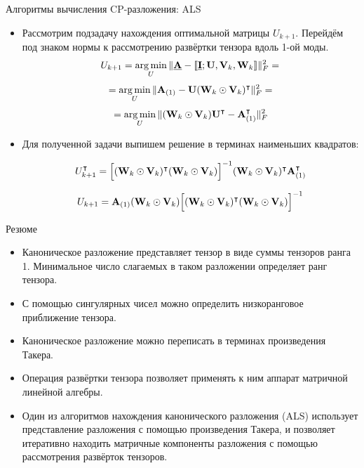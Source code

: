 \begin{frame}{Алгоритмы вычисления CP-разложения: ALS}

\begin{itemize}
    \item Рассмотрим подзадачу нахождения оптимальной матрицы $U_{k+1}$. Перейдём под знаком нормы к рассмотрению развёртки тензора вдоль 1-ой моды.
    $$ \displaystyle U_{k+1} = \operatorname*{arg\,min}_{U}{\lVert \underline{\textbf{A}} - \llbracket \underline{\textbf{I}} ; \textbf{U}, \textbf{V}_k,  \textbf{W}_k \rrbracket \rVert_F^2} = $$ $$ = \operatorname*{arg\,min}_{U}{\lVert \textbf{A}_{(1)} -  \textbf{U} (\textbf{W}_k \odot \textbf{V}_k)^\intercal \rVert_F^2 } = $$ $$ = \operatorname*{arg\,min}_{U}{\lVert (\textbf{W}_k \odot \textbf{V}_k) \textbf{U}^\intercal - \textbf{A}_{(1)}^\intercal \rVert_F^2 }$$
    \item Для полученной задачи выпишем решение в терминах наименьших квадратов:

    $$ U_{k+1}^\intercal = \Big[(\textbf{W}_k \odot \textbf{V}_k)^\intercal (\textbf{W}_k \odot \textbf{V}_k)\Big]^{-1} (\textbf{W}_k \odot \textbf{V}_k)^\intercal \textbf{A}_{(1)}^\intercal $$

    $$ U_{k+1} = \textbf{A}_{(1)} (\textbf{W}_k \odot \textbf{V}_k) \Big[(\textbf{W}_k \odot \textbf{V}_k)^\intercal (\textbf{W}_k \odot \textbf{V}_k)\Big]^{-1}$$
\end{itemize}




\end{frame}


\begin{frame}{Резюме}
\begin{itemize}
    \item Каноническое разложение представляет тензор в виде суммы тензоров ранга 1. Минимальное число слагаемых в таком разложении определяет ранг тензора.
    \item С помощью сингулярных чисел можно определить низкоранговое приближение тензора.
    \item Каноническое разложение можно переписать в терминах произведения Такера.
    \item Операция развёртки тензора позволяет применять к ним аппарат матричной линейной алгебры.
    \item Один из алгоритмов нахождения канонического разложения (ALS) использует представление разложения с помощью произведения Такера, и позволяет итеративно находить матричные компоненты разложения с помощью рассмотрения развёрток тензоров.
\end{itemize}
\end{frame}
 